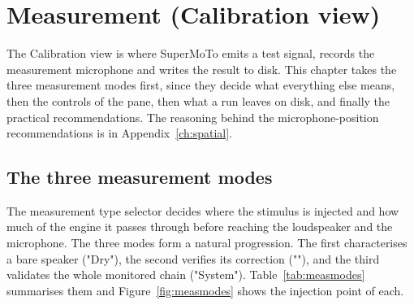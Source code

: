 \chapter{Measurement (Calibration view)}\label{ch:measure}

The Calibration view is where SuperMoTo emits a test signal, records the measurement microphone and writes the result to disk. This chapter takes the three measurement modes first, since they decide what everything else means, then the controls of the pane, then what a run leaves on disk, and finally the practical recommendations. The reasoning behind the microphone-position recommendations is in Appendix~\ref{ch:spatial}.


\section{The three measurement modes}\label{sec:modes}
The measurement type selector decides where the stimulus is injected and how much of the engine it passes through before reaching the loudspeaker and the microphone. The three modes form a natural progression. The first characterises a bare speaker ("Dry"), the second verifies its correction (""), and the third validates the whole monitored chain ("System"). Table~\ref{tab:measmodes} summarises them and Figure~\ref{fig:measmodes} shows the injection point of each.

